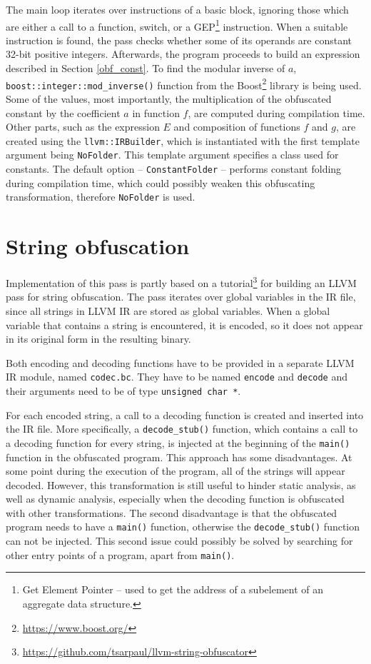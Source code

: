 \documentclass[
  digital, %
  table,   %
  twoside, %
  nolof,     %
  nolot,     %
]{fithesis3}
\theoremstyle{definition}
\begin{document}
The main loop iterates over instructions of a basic block, ignoring those which are either a call to a function, switch, or a GEP\footnote{Get Element Pointer -- used to get the address of a subelement of an aggregate data structure.} instruction. When a suitable instruction is found, the pass checks whether some of its operands are constant 32-bit positive integers. Afterwards, the program proceeds to build an expression described in Section \ref{obf_const}. To find the modular inverse of $a$, \texttt{boost::integer::mod\_inverse()} function from the Boost\footnote{\url{https://www.boost.org/}} library is being used. Some of the values, most importantly, the multiplication of the obfuscated constant by the coefficient $a$ in function $f$, are computed during compilation time. Other parts, such as the expression $E$ and composition of functions $f$ and $g$, are created using the \texttt{llvm::IRBuilder}, which is instantiated with the first template argument being \texttt{NoFolder}. This template argument specifies a class used for constants. The default option -- \texttt{ConstantFolder} -- performs constant folding during compilation time, which could possibly weaken this obfuscating transformation, therefore \texttt{NoFolder} is used. 



\section{String obfuscation}
Implementation of this pass is partly based on a tutorial\footnote{\url{https://github.com/tsarpaul/llvm-string-obfuscator}} for building an LLVM pass for string obfuscation. The pass iterates over global variables in the IR file, since all strings in LLVM IR are stored as global variables. When a global variable that contains a string is encountered, it is encoded, so it does not appear in its original form in the resulting binary. 

Both encoding and decoding functions have to be provided in a separate LLVM IR module, named \texttt{codec.bc}. They have to be named \texttt{encode} and \texttt{decode} and their arguments need to be of type \texttt{unsigned char *}. 

For each encoded string, a call to a decoding function is created and inserted into the IR file. More specifically, a \texttt{decode\_stub()} function, which contains a call to a decoding function for every string, is injected at the beginning of the \texttt{main()} function in the obfuscated program. This approach has some disadvantages. At some point during the execution of the program, all of the strings will appear decoded. However, this transformation is still useful to hinder static analysis, as well as dynamic analysis, especially when the decoding function is obfuscated with other transformations. The second disadvantage is that the obfuscated program needs to have a \texttt{main()} function, otherwise the \texttt{decode\_stub()} function can not be injected. This second issue could possibly be solved by searching for other entry points of a program, apart from \texttt{main()}.
\end{document}
